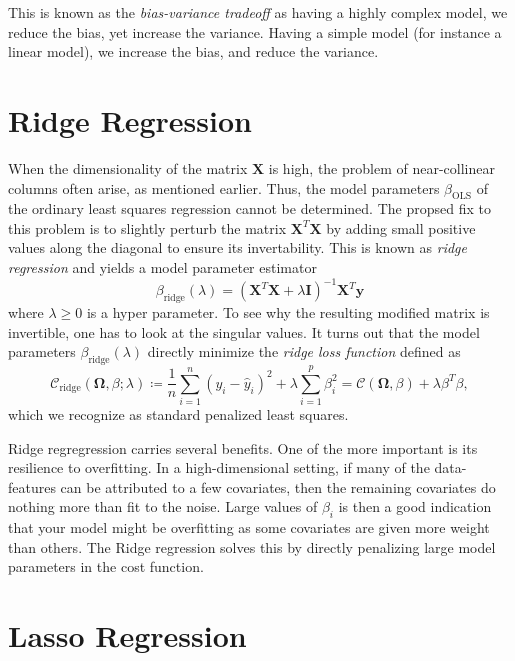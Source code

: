 \documentclass[dvipsnames, article, a4paper, oneside, 12pt]{memoir}
\newcommand{\X}{\bm{X}}
\newcommand{\OLS}{\mathrm{OLS}}
\newcommand{\ridge}{\mathrm{ridge}}
\newcommand{\mat}[1]{\bm{#1}}
\newcommand{\y}{\bm{y}}
\newcommand{\data}{\bm{\Omega}}
\newcommand{\cost}{\mathcal{C}}
\begin{document}
  This is known as the \emph{bias-variance tradeoff} as having a highly complex
  model, we reduce the bias, yet increase the variance.  Having a simple model
  (for instance a linear model), we increase the bias, and reduce the variance.


  \section{Ridge Regression}
  
  When the dimensionality of the matrix \( \X \) is high, the problem of
  near-collinear columns often arise, as mentioned earlier. Thus, the model
  parameters \( \beta_{\OLS} \) of the ordinary least squares regression cannot
  be determined. The propsed fix to this problem
  \cite{tikhonovNumericalMethodsSolution1995,hoerlRidgeRegressionBiased} is to
  slightly perturb the matrix \( \X^T \X \) by adding small positive values
  along the diagonal to ensure its invertability. This is known as \emph{ridge
  regression} and yields a model parameter estimator
  \begin{equation}
    \beta_{\ridge}(\lambda) = (\X^T\X + \lambda\mat{I})^{-1}\X^T\y
  \end{equation}
  where \( \lambda \geq 0 \) is a hyper parameter. To see why the resulting
  modified matrix is invertible, one has to look at the singular values.  It
  turns out that the model parameters \( \beta_{\ridge}(\lambda) \) directly
  minimize the \emph{ridge loss function} defined as
  \begin{equation}
    \cost_{\ridge}(\data, \beta;  \lambda) \coloneqq \frac{1}{n} \sum_{i=1}^n
    (y_i - \hat{y}_i)^2 + \lambda \sum_{i=1}^p \beta_i^2 = \cost(\data, \beta)
    + \lambda \beta^T \beta,
  \end{equation}
  which we recognize as standard penalized least squares.
  
  Ridge regregression carries several benefits. One of the more important is
  its resilience to overfitting. In a high-dimensional setting, if many of the
  data-features can be attributed to a few covariates, then the remaining
  covariates do nothing more than fit to the noise. Large values of \( \beta_i
  \) is then a good indication that your model might be overfitting as some
  covariates are given more weight than others.  The Ridge regression solves
  this by directly penalizing large model parameters in the cost function. 
  
  \section{Lasso Regression}
\end{document}
